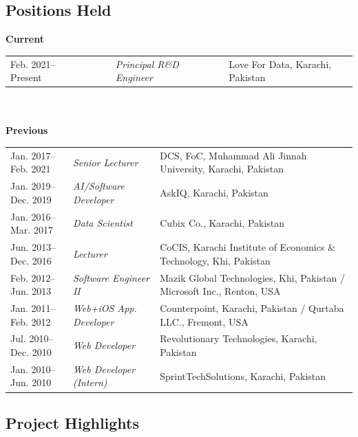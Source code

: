 \documentclass[a4paper, 10pt]{article}
\begin{document}
\subsection*{\textcolor{NavyBlue}{Positions Held}}
{\bfseries Current}\\
{
\tabcolsep=4pt
\begin{tabular}{lll}
Feb. 2021--Present\ \ \ \ \ \ & \emph{ Principal R\&D Engineer}\ \ \ & Love For Data, Karachi, Pakistan\\
\end{tabular}
}\\\\
{\bfseries Previous}\\
{
\tabcolsep=4pt
\begin{tabular}{lll}
Jan. 2017--Feb. 2021 & \emph{ Senior Lecturer} & DCS, FoC, Muhammad Ali Jinnah University, Karachi, Pakistan \\
Jan. 2019--Dec. 2019 & \emph{ AI/Software Developer} & AskIQ, Karachi, Pakistan \\
Jan. 2016--Mar. 2017 & \emph{ Data Scientist} & Cubix Co., Karachi, Pakistan \\
Jun. 2013--Dec. 2016 & \emph{ Lecturer} & CoCIS, Karachi Institute of Economics \& Technology, Khi, Pakistan \\
Feb. 2012--Jun. 2013 & \emph{ Software Engineer II} & Mazik Global Technologies, Khi, Pakistan / Microsoft Inc., Renton, USA \\
Jan. 2011--Feb. 2012 & \emph{ Web+iOS App. Developer} & Counterpoint, Karachi, Pakistan / Qurtaba LLC., Fremont, USA \\
Jul. 2010--Dec. 2010 & \emph{ Web Developer} & Revolutionary Technologies, Karachi, Pakistan\\
Jan. 2010--Jun. 2010 & \emph{ Web Developer (Intern)} & SprintTechSolutions, Karachi, Pakistan
\end{tabular}
}

\subsection*{\textcolor{NavyBlue}{Project Highlights}}
\end{document}
